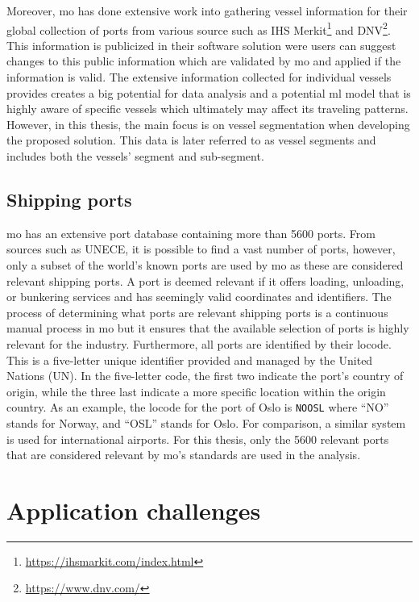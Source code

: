 Moreover, \acrshort{mo} has done extensive work into gathering vessel information for their global collection of ports from various source such as IHS Merkit\footnote{\url{https://ihsmarkit.com/index.html}} and DNV\footnote{\url{https://www.dnv.com/}}. This information is publicized in their software solution were users can suggest changes to this public information which are validated by \acrshort{mo} and applied if the information is valid. The extensive information collected for individual vessels provides creates a big potential for data analysis and a potential \acrshort{ml} model that is highly aware of specific vessels which ultimately may affect its traveling patterns. However, in this thesis, the main focus is on vessel segmentation when developing the proposed solution. This data is later referred to as vessel segments and includes both the vessels' segment and sub-segment.

\subsection{Shipping ports}
\label{sec:shipping_ports}

\acrshort{mo} has an extensive port database containing more than 5600 ports. From sources such as UNECE, it is possible to find a vast number of ports, however, only a subset of the world's known ports are used by \acrshort{mo} as these are considered relevant shipping ports. A port is deemed relevant if it offers loading, unloading, or bunkering services and has seemingly valid coordinates and identifiers. The process of determining what ports are relevant shipping ports is a continuous manual process in \acrshort{mo} but it ensures that the available selection of ports is highly relevant for the industry. Furthermore, all ports are identified by their \gls{locode}. This is a five-letter unique identifier provided and managed by the United Nations (UN). In the five-letter code, the first two indicate the port's country of origin, while the three last indicate a more specific location within the origin country. As an example, the \gls{locode} for the port of Oslo is \texttt{NOOSL} where ``NO'' stands for Norway, and ``OSL'' stands for Oslo. For comparison, a similar system is used for international airports. For this thesis, only the 5600 relevant ports that are considered relevant by \acrshort{mo}'s standards are used in the analysis.

\section{Application challenges}


